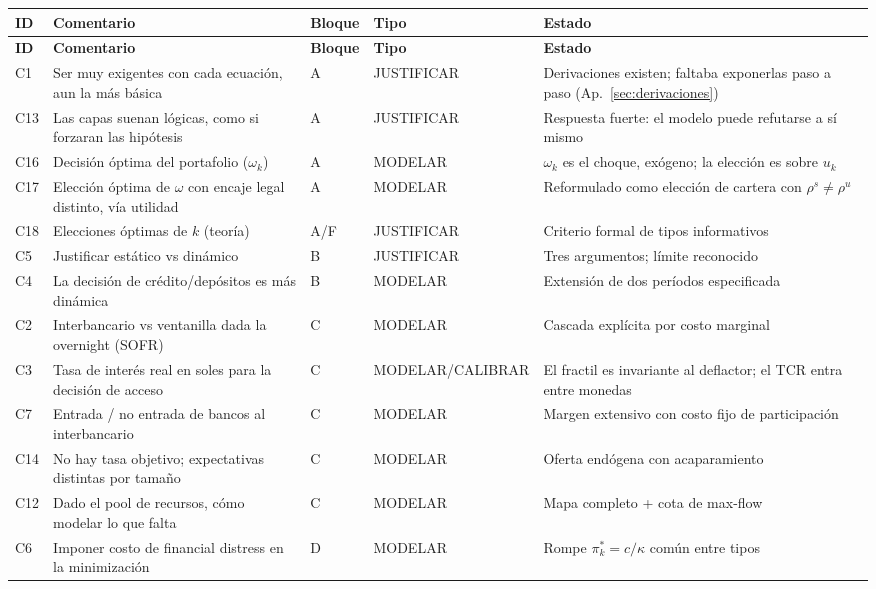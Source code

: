 \documentclass[11pt]{article}
\theoremstyle{definition}
\begin{document}
\begin{longtable}{@{}p{0.6cm}p{5.6cm}p{1.3cm}p{2.5cm}p{4.2cm}@{}}
\toprule
\textbf{ID} & \textbf{Comentario} & \textbf{Bloque} & \textbf{Tipo} &
\textbf{Estado} \\
\midrule
\endfirsthead
\toprule
\textbf{ID} & \textbf{Comentario} & \textbf{Bloque} & \textbf{Tipo} &
\textbf{Estado} \\
\midrule
\endhead
C1  & Ser muy exigentes con cada ecuaci\'on, aun la m\'as b\'asica & A & JUSTIFICAR & Derivaciones existen; faltaba exponerlas paso a paso (Ap.~\ref{sec:derivaciones}) \\
C13 & Las capas suenan l\'ogicas, como si forzaran las hip\'otesis & A & JUSTIFICAR & Respuesta fuerte: el modelo puede refutarse a s\'i mismo \\
C16 & Decisi\'on \'optima del portafolio ($\omega_k$) & A & MODELAR & $\omega_k$ es el choque, exógeno; la elecci\'on es sobre $u_k$ \\
C17 & Elecci\'on \'optima de $\omega$ con encaje legal distinto, v\'ia utilidad & A & MODELAR & Reformulado como elecci\'on de cartera con $\rho^s\neq\rho^u$ \\
C18 & Elecciones \'optimas de $k$ (teor\'ia) & A/F & JUSTIFICAR & Criterio formal de tipos informativos \\
C5  & Justificar est\'atico vs din\'amico & B & JUSTIFICAR & Tres argumentos; l\'imite reconocido \\
C4  & La decisi\'on de cr\'edito/dep\'ositos es m\'as din\'amica & B & MODELAR & Extensi\'on de dos per\'iodos especificada \\
C2  & Interbancario vs ventanilla dada la overnight (SOFR) & C & MODELAR & Cascada expl\'icita por costo marginal \\
C3  & Tasa de inter\'es real en soles para la decisi\'on de acceso & C & MODELAR/\allowbreak CALIBRAR & El fractil es invariante al deflactor; el TCR entra entre monedas \\
C7  & Entrada / no entrada de bancos al interbancario & C & MODELAR & Margen extensivo con costo fijo de participaci\'on \\
C14 & No hay tasa objetivo; expectativas distintas por tama\~no & C & MODELAR & Oferta end\'ogena con acaparamiento \\
C12 & Dado el pool de recursos, c\'omo modelar lo que falta & C & MODELAR & Mapa completo + cota de max-flow \\
C6  & Imponer costo de financial distress en la minimizaci\'on & D & MODELAR & Rompe $\pi^*_k=c/\kappa$ com\'un entre tipos \\

\end{longtable}
\end{document}
